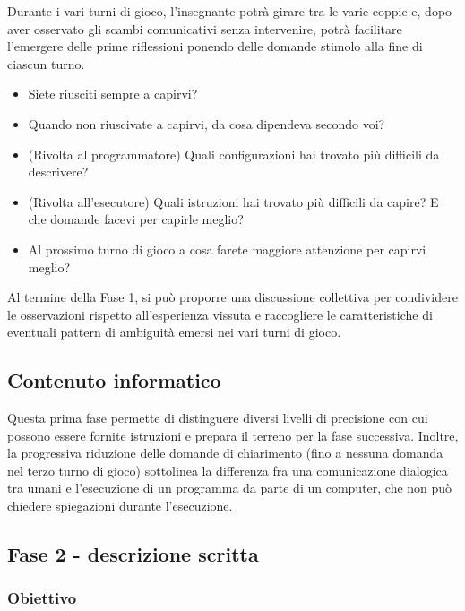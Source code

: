 Durante i vari turni di gioco, l'insegnante potrà girare tra le varie coppie e, dopo aver osservato gli scambi comunicativi senza intervenire, potrà facilitare l'emergere delle prime riflessioni ponendo delle domande stimolo alla fine di ciascun turno.

\begin{domandestimolo}\label{domande-stimolo}

\begin{itemize}
\item
  Siete riusciti sempre a capirvi?
\item
  Quando non riuscivate a capirvi, da cosa dipendeva secondo voi?
\item
  (Rivolta al programmatore) Quali configurazioni hai trovato più difficili da descrivere?
\item
  (Rivolta all'esecutore) Quali istruzioni hai trovato più difficili da capire? E che domande facevi per capirle meglio?
\item
  Al prossimo turno di gioco a cosa farete maggiore attenzione per capirvi meglio?
\end{itemize}
\end{domandestimolo}

Al termine della Fase 1, si può proporre una discussione collettiva per condividere le osservazioni rispetto all'esperienza vissuta e raccogliere le caratteristiche di eventuali pattern di ambiguità emersi nei vari turni di gioco.

\subsection{Contenuto informatico }\label{contenuto-informatico-2}

Questa prima fase permette di distinguere diversi livelli di precisione con cui possono essere fornite istruzioni e prepara il terreno per la fase successiva. Inoltre, la progressiva riduzione delle domande di chiarimento (fino a nessuna domanda nel terzo turno di gioco) sottolinea la differenza fra una comunicazione dialogica tra umani e l'esecuzione di un programma da parte di un computer, che non può chiedere spiegazioni durante l'esecuzione.


\subsection{Fase 2 - descrizione scritta }\label{fase-2---descrizione-scritta}

\subsubsection{Obiettivo}\label{obiettivo}

